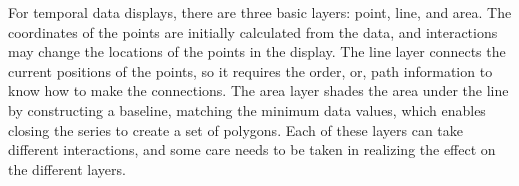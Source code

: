 \documentclass[12pt]{article}
\providecommand{\tabularnewline}{\\}
\begin{document}
%
%






For temporal data displays, there are three basic layers: point, line, and area. The coordinates of the points are initially calculated from the data, and interactions may change the locations of the points in the display. The line layer connects the current positions of the points, so it requires the order, or, path information to know how to make the connections. The area layer shades the area under the line by constructing a baseline, matching the minimum data values, which enables closing the series to create a set of polygons.  %
Each of these layers can take different interactions, and some care needs to be taken in realizing the effect on the different layers.
\end{document}
